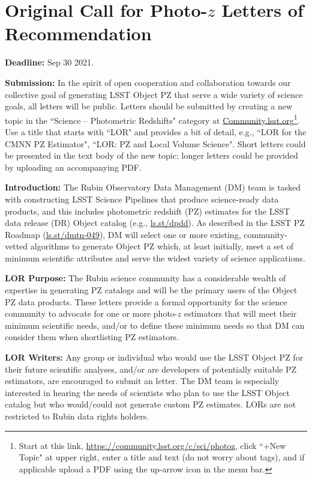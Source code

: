 \documentclass[DM,authoryear,toc]{lsstdoc}
\begin{document}
\section{Original Call for Photo-$z$ Letters of Recommendation}\label{sec:orig_LOR}

\textbf{Deadline:} Sep 30 2021.

\textbf{Submission:} 
In the spirit of open cooperation and collaboration towards our collective goal of generating LSST Object PZ that serve a wide variety of science goals, all letters will be public.
Letters should be submitted by creating a new topic in the ``Science -- Photometric Redshifts" category at \url{Community.lsst.org}\footnote{Start at this link, \url{https://community.lsst.org/c/sci/photoz}, click ``+New Topic" at upper right, enter a title and text (do not worry about tags), and if applicable upload a PDF using the up-arrow icon in the menu bar.}.
Use a title that starts with ``LOR" and provides a bit of detail, e.g., ``LOR for the CMNN PZ Estimator", ``LOR: PZ and Local Volume Science".
Short letters could be presented in the text body of the new topic; longer letters could be provided by uploading an accompanying PDF.

\textbf{Introduction:} 
The Rubin Observatory Data Management (DM) team is tasked with constructing LSST Science Pipelines that produce science-ready data products, and this includes photometric redshift (PZ) estimates for the LSST data release (DR) Object catalog (e.g., \url{ls.st/dpdd}).
As described in the LSST PZ Roadmap (\url{ls.st/dmtn-049}), DM will select one or more existing, community-vetted algorithms to generate Object PZ which, at least initially, meet a set of minimum scientific attributes and serve the widest variety of science applications.

\textbf{LOR Purpose:}
The Rubin science community has a considerable wealth of expertise in generating PZ catalogs and will be the primary users of the Object PZ data products.
These letters provide a formal opportunity for the science community to advocate for one or more photo-$z$ estimators that will meet their minimum scientific needs, and/or to define these minimum needs so that DM can consider them when shortlisting PZ estimators.

\textbf{LOR Writers:}
Any group or individual who would use the LSST Object PZ for their future scientific analyses, and/or are developers of potentially suitable PZ estimators, are encouraged to submit an letter.
The DM team is especially interested in hearing the needs of scientists who plan to use the LSST Object catalog but who would/could not generate custom PZ estimates.
LORs are not restricted to Rubin data rights holders.
\end{document}
